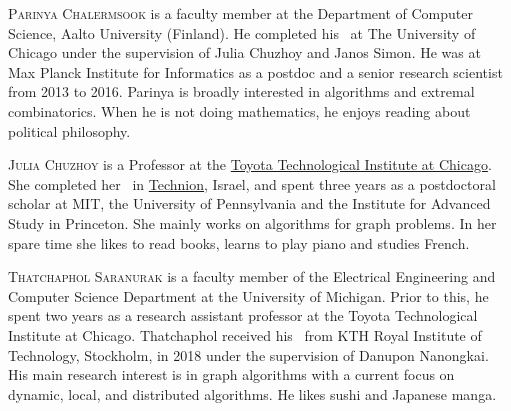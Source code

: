 \documentclass{toc}
\begin{document}
%
%
%
%
%
%
%
%
%
%
%
%
%
%
\begin{tocaboutauthors}
%
%
%
%
%
%
%
%
\begin{tocabout}[chalermsook]
\textsc{Parinya Chalermsook} is a faculty member at the Department of
Computer Science, Aalto University (Finland). He completed his \phd\ at
The University of Chicago under the supervision of Julia Chuzhoy and 
Janos Simon. He was at Max Planck Institute for Informatics as a 
postdoc and a senior research scientist from 2013 to 2016. Parinya 
is broadly interested in algorithms and extremal combinatorics. 
When he is not doing mathematics, he enjoys reading about 
political philosophy.
\end{tocabout}
\begin{tocabout}[chuzhoy]
\textsc{Julia Chuzhoy} is a Professor at the 
\href{https://ttic.edu/}{Toyota Technological Institute at Chicago}. 
She completed her \phd\ in \href{https://www.technion.ac.il/}{Technion}, 
Israel, and %
spent  %
three years as a postdoctoral scholar at MIT, the University of 
Pennsylvania and 
the  %
Institute for Advanced %
Study  %
in Princeton. She mainly works on algorithms for graph problems. 
In her spare time she likes to read books, learns to play piano 
and studies French.
\end{tocabout}
\begin{tocabout}[saranurak]
\textsc{Thatchaphol Saranurak} is a faculty member of 
the  %
Electrical Engineering and Computer Science Department at the University
of Michigan. Prior to this, he spent two years as a research assistant 
professor at
the  %
Toyota Technological Institute at Chicago. Thatchaphol received
his \phd\ from KTH Royal Institute of Technology, 
Stockholm,  %
in 2018 under the supervision of Danupon Nanongkai. His main 
research interest is %
in  %
graph algorithms with a current focus on dynamic, local, and 
distributed algorithms. He likes sushi and %
Japanese  %
manga.
\end{tocabout}
\end{tocaboutauthors}
\end{document}
